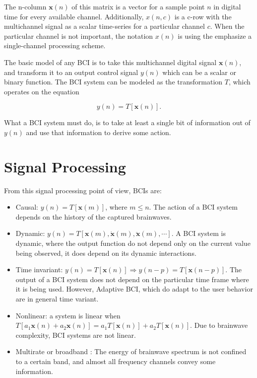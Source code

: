The n-column $\mathbf{x}(n)$ of this matrix is a vector for a sample point $n$ in digital time for every available channel.  Additionally, $x(n,c)$  is a c-row with the multichannel signal as a scalar time-series for a particular channel $c$.  When the particular channel is not important, the notation $x(n)$ is using the emphasize a single-channel processing scheme.

The basic model of any BCI is to take this multichannel digital signal $\mathbf{x}(n)$, and transform it to an output control signal $y(n)$ which can be a scalar or binary function.  The BCI system can be modeled as the transformation $T$, which operates on the equation

\begin{equation}
y(n) = T\left[\mathbf{x}(n)\right].
\label{eq:bcimodel}
\end{equation}

What a BCI system must do, is to take at least a single bit of information out of $y(n)$ and use that information to derive some action. 

\section{Signal Processing}

From this signal processing point of view, BCIs are:

\begin{itemize}
\item Causal:  $ y(n) = T\left[  \mathbf{x}(m) \right] $, where $ m \leq n $.  The action of a BCI system depends on the history of the captured brainwaves.
\item Dynamic: $ y(n) = T\left[ \mathbf{x}(m),  \mathbf{\dot{x}}(m),\mathbf{\ddot{x}}(m), \cdots \right] $.  A BCI system is dynamic, where the output function do not depend only on the current value being observed, it does depend on its dynamic interactions.
\item Time invariant: $ y(n) = T\left[ \mathbf{x}(n) \right] \Rightarrow y(n-p) = T\left[ \mathbf{x}(n-p) \right] $.  The output of a BCI system does not depend on the particular time frame where it is being used.  However, Adaptive BCI, which do adapt to the user behavior are in general time variant.
\item Nonlinear: a system is linear when $T\left[ a_1 \mathbf{x}(n) + a_2 \mathbf{x}(n) \right]  = a_1 T \left[ \mathbf{x}(n) \right] + a_2 T \left[ \mathbf{x}(n) \right] $. Due to brainwave complexity, BCI systems are not linear.
\item Multirate or broadband \cite{Miller2010}:  The energy of brainwave spectrum is not confined to a certain band, and almost all frequency channels convey some information.
\end{itemize}

